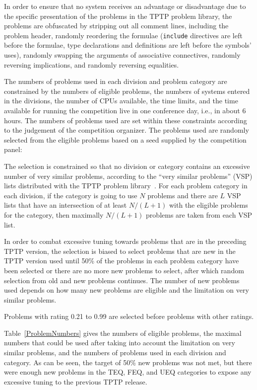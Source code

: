 \documentclass[aic]{iosart2x}
\newenvironment{packed_itemize}{
\vspace*{-0.3em}
\begin{itemize}
  \setlength{\partopsep}{0pt}
  \setlength{\itemsep}{1pt}
  \setlength{\parskip}{0pt}
  \setlength{\parsep}{0pt}
}{\end{itemize}}
\begin{document}
In order to ensure that no system receives an advantage or disadvantage due to the specific
presentation of the problems in the TPTP problem library, the problems are obfuscated by
stripping out all comment lines, including the problem header,
randomly reordering the formulae (\texttt{include} directives are left before the formulae, 
type declarations and definitions are left before the symbols' uses),
randomly swapping the arguments of associative connectives,
randomly reversing implications, and
randomly reversing equalities.

The numbers of problems used in each division and problem category are constrained by the
numbers of eligible problems, the numbers of systems entered in the divisions, the number of 
CPUs available, the time limits, and the time available for running the competition live
in one conference day, i.e., in about 6 hours.
The numbers of problems used are set within these constraints according to the judgement of the 
competition organizer.
The problems used are randomly selected from the eligible problems based on a seed supplied by
the competition panel:
\begin{packed_itemize}
\item The selection is constrained so that no division or category contains an excessive number
      of very similar problems, according to the ``very similar problems'' (VSP) lists distributed
      with the TPTP problem library~\cite{Sut00-JAR}.
      For each problem category in each division, if the category is going to use $N$ problems
      and there are $L$ VSP lists that have an intersection of at least $N/(L+1)$ with the
      eligible problems for the category, then maximally $N/(L+1)$ problems are taken from each
      VSP list.
\item In order to combat excessive tuning towards problems that are in the preceding TPTP version, 
      the selection is biased to select problems that are new in the TPTP version used until 
      50\% of the problems in each problem category have been selected or there are no more new 
      problems to select, after which random selection from old and new problems continues.
      The number of new problems used depends on how many new problems are eligible and the
      limitation on very similar problems.
\item Problems with rating 0.21 to 0.99 are selected before problems with other ratings.
\end{packed_itemize}
Table~\ref{ProblemNumbers} gives the numbers of eligible problems, the maximal numbers that could
be used after taking into account the limitation on very similar problems,
and the numbers of problems used in each division and category.
As can be seen, the target of 50\% new problems was not met, but there were enough new problems 
in the TEQ, FEQ, and UEQ categories to expose any excessive tuning to the previous TPTP release.
\end{document}

